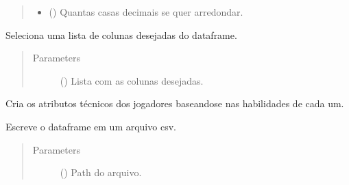 \documentclass[letterpaper,10pt,brazil]{sphinxmanual}
\begin{document}
\begin{fulllineitems}
\begin{fulllineitems}
\begin{quote}
\begin{description}
\begin{itemize}
\item {} 
 () \textendash{} Quantas casas decimais se quer arredondar.

\end{itemize}

\end{description}\end{quote}

\end{fulllineitems}


\begin{fulllineitems}
\label{\detokenize{classe_Fifa_limp:id1}}
Seleciona uma lista de colunas desejadas do dataframe.
\begin{quote}\begin{description}
\item[{Parameters}] \leavevmode
{} () \textendash{} Lista com as colunas desejadas.

\end{description}\end{quote}

\end{fulllineitems}


\begin{fulllineitems}
\label{\detokenize{classe_Fifa_limp:id2}}
Cria os atributos técnicos dos jogadores baseando\sphinxhyphen{}se nas habilidades de cada um.

\end{fulllineitems}


\begin{fulllineitems}
\label{\detokenize{classe_Fifa_limp:id3}}
Escreve o dataframe em um arquivo csv.
\begin{quote}\begin{description}
\item[{Parameters}] \leavevmode
{} () \textendash{} Path do arquivo.


\end{description}
\end{quote}
\end{fulllineitems}
\end{fulllineitems}
\end{document}

